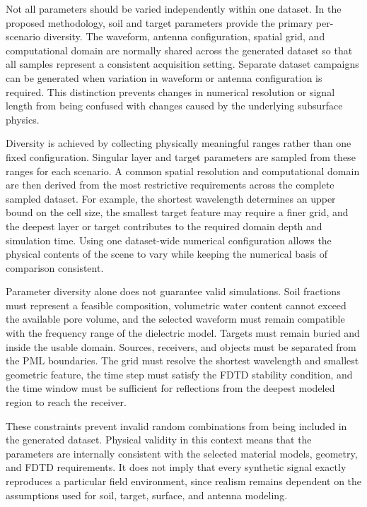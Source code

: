 \documentclass[journal]{IEEEtran}
\begin{document}
Not all parameters should be varied independently within one dataset. In the proposed methodology, soil and target parameters provide the primary per-scenario diversity. The waveform, antenna configuration, spatial grid, and computational domain are normally shared across the generated dataset so that all samples represent a consistent acquisition setting. Separate dataset campaigns can be generated when variation in waveform or antenna configuration is required. This distinction prevents changes in numerical resolution or signal length from being confused with changes caused by the underlying subsurface physics.

Diversity is achieved by collecting physically meaningful ranges rather than one fixed configuration. Singular layer and target parameters are sampled from these ranges for each scenario. A common spatial resolution and computational domain are then derived from the most restrictive requirements across the complete sampled dataset. For example, the shortest wavelength determines an upper bound on the cell size, the smallest target feature may require a finer grid, and the deepest layer or target contributes to the required domain depth and simulation time. Using one dataset-wide numerical configuration allows the physical contents of the scene to vary while keeping the numerical basis of comparison consistent.

Parameter diversity alone does not guarantee valid simulations. Soil fractions must represent a feasible composition, volumetric water content cannot exceed the available pore volume, and the selected waveform must remain compatible with the frequency range of the dielectric model. Targets must remain buried and inside the usable domain. Sources, receivers, and objects must be separated from the PML boundaries. The grid must resolve the shortest wavelength and smallest geometric feature, the time step must satisfy the FDTD stability condition, and the time window must be sufficient for reflections from the deepest modeled region to reach the receiver.

These constraints prevent invalid random combinations from being included in the generated dataset. Physical validity in this context means that the parameters are internally consistent with the selected material models, geometry, and FDTD requirements. It does not imply that every synthetic signal exactly reproduces a particular field environment, since realism remains dependent on the assumptions used for soil, target, surface, and antenna modeling.
\end{document}
